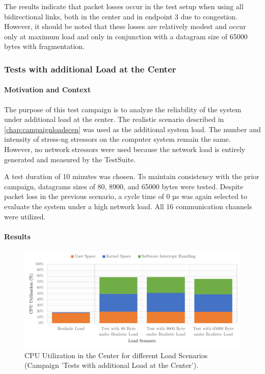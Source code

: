 The results indicate that packet losses occur in the test setup when using all bidirectional links, both in the center and in endpoint 3 due to congestion. However, it should be noted that these losses are relatively modest and occur only at maximum load and only in conjunction with a datagram size of 65000 bytes with fragmentation.

\subsubsection{Tests with additional Load at the Center}

\paragraph{Motivation and Context}
The purpose of this test campaign is to analyze the reliability of the system under additional load at the center. The realistic scenario described in \ref{chap:campaignloadscen} was used as the additional system load. The number and intensity of stress-ng stressors on the computer system remain the same. However, no network stressors were used because the network load is entirely generated and measured by the TestSuite.

A test duration of 10 minutes was chosen. To maintain consistency with the prior campaign, datagrams sizes of 80, 8900, and 65000 bytes were tested. Despite packet loss in the previous scenario, a cycle time of 0 µs was again selected to evaluate the system under a high network load. All 16 communication channels were utilized.

\paragraph{Results}

\begin{figure}[h]
    \centering
    \includegraphics[width=1\linewidth]{figures/reliability/ihawk/diagr7.pdf}
    \caption{CPU Utilization in the Center for different Load Scenarios (Campaign 'Tests with additional Load at the Center').}
    \label{fig:diagr7CPU}
\end{figure}

